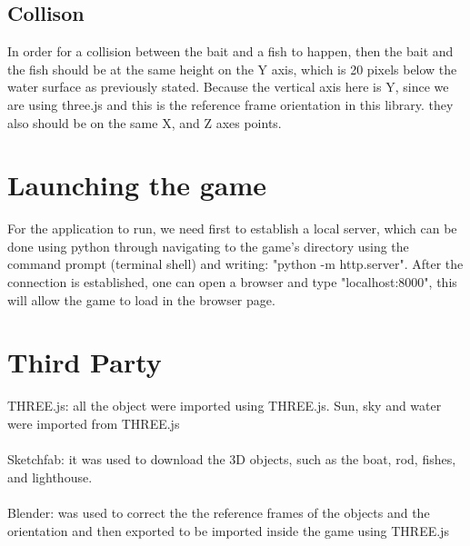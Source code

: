 \documentclass[paper=a4, fontsize=11pt]{scrartcl} %
\numberwithin{equation}{section} %
\numberwithin{figure}{section} %
\numberwithin{table}{section} %
\begin{document}
\subsection{Collison}

In order for a collision between the bait and a fish to happen, then the bait and the fish should be at the same height on the Y axis, which is 20 pixels below the water surface as previously stated. Because the vertical axis here is Y, since we are using three.js and this is the reference frame orientation in this library. they also should be on the same X, and Z axes points.

\section{Launching the game}

For the application to run, we need first to establish a local server, which can be done using python through navigating to the game's directory using the command prompt (terminal shell) and writing: "python -m http.server". After the connection is established, one can open a browser and type "localhost:8000", this will allow the game to load in the browser page.

\section{Third Party}

THREE.js: all the object were imported using THREE.js. Sun, sky and water were imported from THREE.js
\\~\\
Sketchfab: it was used to download the 3D objects, such as the boat, rod, fishes, and lighthouse.
\\~\\
Blender: was used to correct the the reference frames of the objects and the orientation and then exported to be imported inside the game using THREE.js
\end{document}
